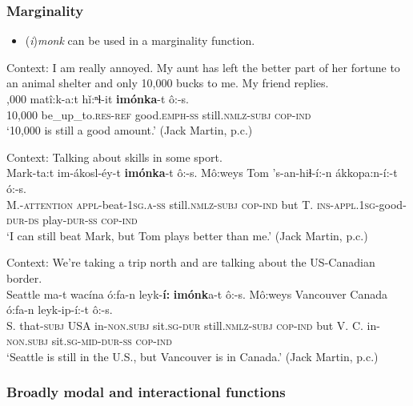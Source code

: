 \subsubsection{Marginality}
\label{appendixCreekMarginal}
\begin{itemize}
	\item (\textit{i})\textit{monk} can be used in a marginality function. 
\end{itemize}
\begin{exe}
	\ex
	Context: I am really annoyed. My aunt has left the better part of her fortune to an animal shelter and only 10,000 bucks to me. My friend replies.\\
	,000 matî:k-a:t	hǐ:ⁿɬ-it \textbf{imónka}-t ô:-s.\\
	10,000 be\_up\_to.\textsc{res}-\textsc{ref} good.\textsc{emph}-\textsc{ss} still.\textsc{nmlz}-\textsc{subj} \textsc{cop}-\textsc{ind}\\
	\glt \lq 10,000 is still a good amount.' (Jack Martin, p.c.)
	
	\ex
	 Context: Talking about skills in some sport.\\
	\gll Mark-ta:t im-ákosl-éy-t \textbf{imónka}-t ô:-s. Mô:weys Tom ’s-an-hiɬ-í:-n ákkopa:n-í:-t ó:-s.\\
	M.-\textsc{attention} \textsc{appl}-beat-1\textsc{sg}.\textsc{a}-\textsc{ss} still.\textsc{nmlz}-\textsc{subj} \textsc{cop}-\textsc{ind} but T. \textsc{ins}-\textsc{appl}.1\textsc{sg}-good-\textsc{dur}-\textsc{ds} play-\textsc{dur}-\textsc{ss} \textsc{cop}-\textsc{ind}\\
	\glt \lq I can still beat Mark, but Tom plays better than me.\rq{ }(Jack Martin, p.c.)
	
	\ex\label{exAppendixCreekScalarCategorizing}
	Context: We’re taking a trip north and are talking about the US-Canadian border.\\
	\gll Seattle ma-t	 wacína ó:fa-n leyk-\textbf{í:} \textbf{imónk}a-t ô:-s. Mô:weys Vancouver Canada ó:fa-n leyk-ip-í:-t ô:-s.\\
	S. that-\textsc{subj} USA in-\textsc{non}.\textsc{subj} sit.\textsc{sg}-\textsc{dur} still.\textsc{nmlz}-\textsc{subj} \textsc{cop}-\textsc{ind} but V. C. in-\textsc{non}.\textsc{subj} sit.\textsc{sg}-\textsc{mid}-\textsc{dur}-\textsc{ss} \textsc{cop}-\textsc{ind}\\
	\glt \lq Seattle is still in the U.S., but Vancouver is in Canada.\rq{ }(Jack Martin, p.c.)
\end{exe}

\subsubsection{Broadly modal and interactional functions}

